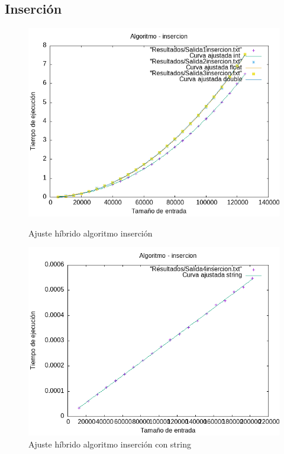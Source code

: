 \documentclass[11pt]{article}
\begin{document}
\subsection*{Inserción}
\begin{figure}[H]
    \begin{minipage}{0.5\textwidth}
        \centering
        \includegraphics[width=\linewidth]{assets/AjusteHibrido_latex/Hibridoinsercion/insercion_hib.png}
        \caption{Ajuste híbrido algoritmo inserción}
        \label{fig:insercion}
    \end{minipage}%
    \begin{minipage}{0.5\textwidth}
        \centering
        \includegraphics[width=\linewidth]{assets/AjusteHibrido_latex/Hibridoinsercion/insercionstring_hib.png}
        \caption{Ajuste híbrido algoritmo inserción con string}
        \label{fig:insercion}
    \end{minipage}
\end{figure}
\end{document}
